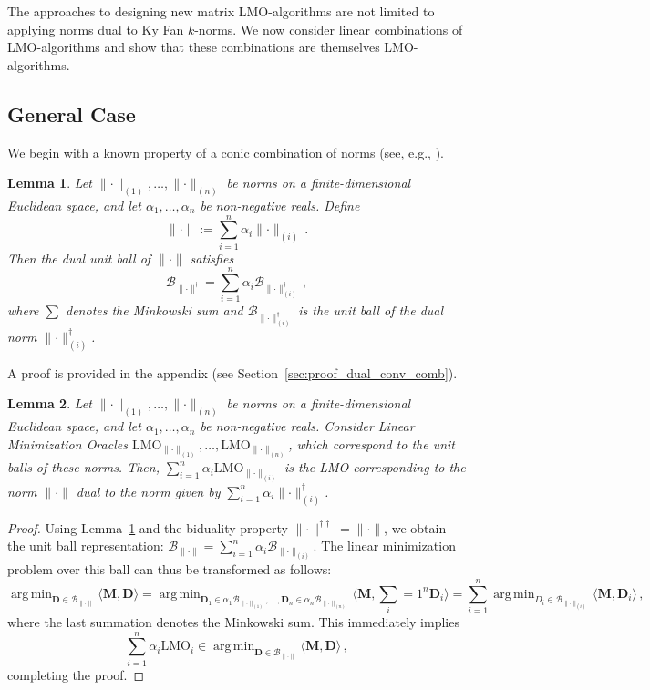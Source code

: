 \documentclass[a4paper,14pt,oneside]{extarticle}
\newtheorem{lemma}{Lemma}
\newcommand{\norm}[1]{\lVert #1\rVert}
\def\<#1,#2>{\langle #1,#2\rangle}
\DeclareMathOperator*{\argmin}{arg\,min}
\newcommand{\mM}{\mathbf{M}}
\newcommand{\mD}{\mathbf{D}}
\newcommand{\cB}{\mathcal{B}}
\newcommand{\sectionref}[1]{Section~\ref{#1}}
\newcommand{\lemmaref}[1]{Lemma~\ref{#1}}
\begin{document}
The approaches to designing new matrix LMO-algorithms are not limited to applying norms dual to Ky Fan $k$-norms. We now consider linear combinations of LMO-algorithms and show that these combinations are themselves LMO-algorithms.

\subsection{General Case}
We begin with a known property of a conic combination of norms (see, e.g., \citep[Table 1]{yu2012arithmetic}).

\begin{lemma}\label{lemma:dual_to_conv_comb}
  Let $\norm{\cdot}_{(1)},\dots,\norm{\cdot}_{(n)}$ be norms on a finite-dimensional Euclidean space, and let $\alpha_1,\dots,\alpha_n$ be non-negative reals. Define
  \[
    \norm{\cdot} := \sum_{i = 1}^n \alpha_i \norm{\cdot}_{(i)}\,.
  \]
  Then the dual unit ball of $\norm{\cdot}$ satisfies
  \[
    \cB_{\norm{\cdot}^\dagger}
    = \sum_{i = 1}^n \alpha_i \cB_{\norm{\cdot}_{(i)}^\dagger}\,,
  \]
  where $\sum$ denotes the Minkowski sum and $\cB_{\norm{\cdot}_{(i)}^\dagger}$ is the unit ball of the dual norm $\norm{\cdot}_{(i)}^\dagger$.
\end{lemma}

A proof is provided in the appendix (see \sectionref{sec:proof_dual_conv_comb}).

\begin{lemma}\label{lemma:lin_comb_lmo}
  Let $\norm{\cdot}_{(1)}, \dots, \norm{\cdot}_{(n)}$ be norms on a finite-dimensional Euclidean space, and let $\alpha_1, \dots, \alpha_n$ be non-negative reals. Consider Linear Minimization Oracles $\mathrm{LMO}_{\norm{\cdot}_{(1)}}, \dots, \mathrm{LMO}_{\norm{\cdot}_{(n)}}$, which correspond to the unit balls of these norms. Then, $\sum_{i = 1}^n \alpha_i \mathrm{LMO}_{\norm{\cdot}_{(i)}}$ is the LMO corresponding to the norm $\norm{\cdot}$ dual to the norm given by $\sum_{i = 1}^n \alpha_i \norm{\cdot}_{(i)}^\dagger$.
\end{lemma}

\begin{proof}
  Using \lemmaref{lemma:dual_to_conv_comb} and the biduality property $\norm{\cdot}^{\dagger \dagger} = \norm{\cdot}$, we obtain the unit ball representation: $\cB_{\norm{\cdot}} = \sum_{i = 1}^n \alpha_i \cB_{\norm{\cdot}_{(i)}}$. The linear minimization problem over this ball can thus be transformed as follows:
  \[
  \argmin_{\mD \in \cB_{\norm{\cdot}}}\<\mM, \mD> = \argmin_{\mD_1 \in \alpha_1 \cB_{\norm{\cdot}_{(1)}},\dots,\mD_n \in \alpha_n\cB_{\norm{\cdot}_{(n)}}}\<\mM, \sum_{i = 1}^n\mD_i> = \sum_{i = 1}^n \argmin_{D_i \in \cB_{\norm{\cdot}_{(i)}}}\<\mM, \mD_i>\,,
  \]
  where the last summation denotes the Minkowski sum. This immediately implies 
  \[
  \sum_{i = 1}^n \alpha_i \mathrm{LMO}_{i} \in \argmin_{\mD \in \cB_{\norm{\cdot}}}\<\mM, \mD>\,,
  \] 
  completing the proof.
\end{proof}
\end{document}
